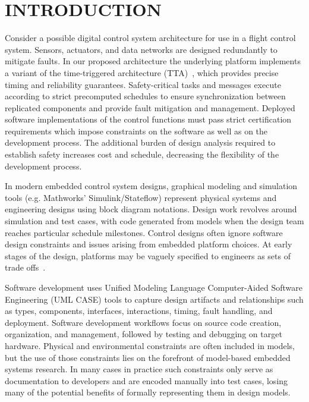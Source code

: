 \section{INTRODUCTION}

Consider a possible digital control system architecture
for use in a flight control system.  Sensors,  actuators, and
data networks are designed redundantly to mitigate faults.  In our 
proposed architecture the underlying platform 
implements a variant of the time-triggered architecture 
(TTA)~\cite{timed:tta}, which provides precise timing 
and reliability guarantees.  Safety-critical tasks 
and messages execute according to strict precomputed 
schedules to ensure synchronization between replicated 
components and provide fault mitigation and management.  
Deployed software implementations of the control functions must 
pass strict certification requirements which impose 
constraints on the software as well as on the development 
process.  The additional burden of design analysis required to 
establish safety increases cost and schedule, decreasing the
flexibility of the development process.

In modern embedded control system designs, graphical modeling
and simulation tools (e.g. Mathworks' Simulink/Stateflow) represent 
physical systems and engineering designs using block diagram notations. 
Design work revolves around simulation and test cases, with 
code generated from models when the design team reaches 
particular schedule milestones. Control designs often 
ignore software design constraints and issues arising 
from embedded platform choices. At early stages of the 
design, platforms may be vaguely specified to engineers 
as sets of trade offs~\cite{modeling:platform}.

Software development uses Unified Modeling Language 
Computer-Aided Software Engineering (UML CASE) tools to 
capture design artifacts and relationships such as types, components, 
interfaces, interactions,  timing, fault handling, and deployment.  Software development workflows focus on source code creation, organization, and management, followed by testing and debugging on target hardware. 
Physical and environmental constraints are often included in models, 
but the use of those constraints lies on the forefront of model-based
embedded systems research.  In many cases in practice such constraints 
only serve as documentation to developers and are encoded manually 
into test cases, losing many of the potential benefits of formally representing them in design models.

